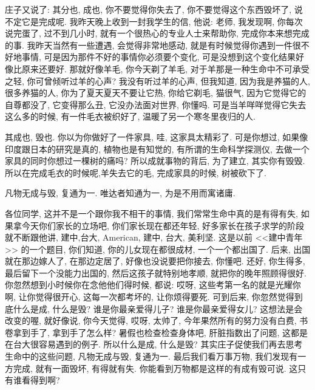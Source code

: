 \documentclass[11pt]{article}
\begin{document}
\vspace{-0.5cm}

庄子又说了: {\color{blue} 其分也, 成也}, 你不要觉得你失去了, 你不要觉得这个东西毁坏了, 说不定它是完成呢. 我昨天晚上收到一封我学生的信, 他说: 老师, 我发现啊, 你每次说完蛋了, 过不到几小时, 就有一个很热心的专业人士来帮助你, 完成你本来想完成的事. 我昨天当然有一些遭遇, 会觉得非常地感动, 就是有时候觉得你遇到一件很不好地事情, 可是因为那件不好的事情你必须要个变化, 可是没想到这个变化结果好像比原来还要好. 那就好像羊毛, 你今天剃了羊毛, 对于羊那是一种生命中不可承受之轻, 你可曾倾听过羊的心声? 我没有听过羊的心声, 但我知道, 因为我是养猫的人, 很多养猫的人, 你为了夏天夏天不要让它热, 你给它剃毛, 猫很气, 因为它觉得它的自尊都没了, 它变得那么丑, 它没办法面对世界, 你懂吗. 可是当羊咩咩觉得它失去这么多的时候, 有一件毛衣被织好了, 温暖了另一个寒冬里夜归的人.

{\color{blue} 其成也, 毁也.} 你以为你做好了一件家具, 哇, 这家具太精彩了. 可是你想过, 如果像印度跟日本的研究是真的, 植物也是有知觉的, 有所谓的生命科学探测仪, 去做一个家具的同时你想过一棵树的痛吗? 所以成就事物的背后, 为了建立, 其实你有毁毁. 所以在完成毛衣的时候呢,羊失去它的毛, 完成家具的时候, 树被砍下了. 



\begin{center}
	\color{green} 凡物无成与毁, 复通为一. 唯达者知通为一, 为是不用而寓诸庸.
\end{center}

\vspace{-0.5cm}

各位同学, 这并不是一个跟你我不相干的事情, 我们常常生命中真的是有得有失, 如果拿今天你们家长的立场吧, 你们家长现在都还年轻, 好多家长在孩子求学的阶段就不断跟他讲, 建中,台大, American, 建中, 台大, 美利坚. 这是以前 <<建中青年>> 的一个题目, 你们知道, 你的儿女现在都很成材, 一个一个都出国了. 后来, 出国就在那边嫁人了, 在那边定居了, 好像也没说要把你接去, 你懂吧. 还好, 你生得多, 最后留下一个没能力出国的, 然后这孩子就特别地孝顺, 就把你的晚年照顾得很好. 你忽然想到小时候你在念他他们得时候, 都说: 哎呀, 这些考第一名的就是光耀你啊, 让你觉得很开心, 这每一次都考坏的, 让你烦得要死. 可到后来, 你忽然觉得到底什么是成, 什么是毁? 谁是你最亲爱得儿子? 谁是你最亲爱得女儿? 这想法是会改变的喔, 就好像说, 你今天觉得, 哎呀, 太帅了, 今年果然所有的努力没有白费, 书卷拿到手了, 拿到手了怎么样? 暑假也检查检查身体吧, 肝脏指数出了问题, 这都是在台大很容易遇到的例子. 所以什么是成, 什么是毁? 其实庄子促使我们再去思考生命中的这些问题, {\color{blue} 凡物无成与毁, 复通为一.} 最后我们看万事万物, 我们发现有一方完成, 就有一面毁坏, 有得就有失. 你能看到万物都是这样的有成有毁可说. 这只有谁看得到啊?
\end{document}

